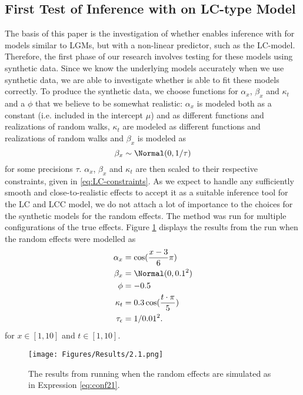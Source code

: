 \subsection{First Test of Inference with \inlabru on LC-type Model}
The basis of this paper is the investigation of whether \inlabru enables inference with \inla for models similar to LGMs, but with a non-linear predictor, such as the LC-model. Therefore, the first phase of our research involves testing \inlabru for these models using synthetic data. Since we know the underlying models accurately when we use synthetic data, we are able to investigate whether \inlabru is able to fit these models correctly. 
\newline
\noindent To produce the synthetic data, we choose functions for $\alpha_x$, $\beta_x$ and $\kappa_t$ and a $\phi$ that we believe to be somewhat realistic: $\alpha_x$ is modeled both as a constant (i.e. included in the intercept $\mu$) and as different functions and realizations of random walks, $\kappa_t$ are modeled as different functions and realizations of random walks and $\beta_x$ is modeled as 
\begin{equation*}
    \beta_x \sim \Normal(0,1/\tau)
\end{equation*} 
for some precisions $\tau$. $\alpha_x$, $\beta_x$ and $\kappa_t$ are then scaled to their respective constraints, given in \ref{eq:LC-constraints}. As we expect \inlabru to handle any sufficiently smooth and close-to-realistic effects to accept it as a suitable inference tool for the LC and LCC model, we do not attach a lot of importance to the choices for the synthetic models for the random effects. 
The \inlabru method was run for multiple configurations of the true effects. Figure \ref{fig:firstRun} displays the results from the run when the random effects were modelled as
\begin{equation}
    \begin{aligned}
    \alpha_x &= \cos(\frac{x-3}{6}\pi)\\
    \beta_x &= \Normal(0,0.1^2)\\
    \phi &= -0.5\\
    \kappa_t &= 0.3\cos(\frac{t\cdot \pi}{5})\\
    \tau_{\epsilon} &= 1/0.01^2.
    \end{aligned}
    \label{eq:conf21}
\end{equation}
for $x\in [1,10]$ and $t \in [1,10]$. 
\begin{figure}[h!]
    \centering
    \texttt{[image: Figures/Results/2.1.png]}
    \caption{The results from running \inlabru when the random effects are simulated as in Expression \ref{eq:conf21}.}
    \label{fig:firstRun}
\end{figure}
